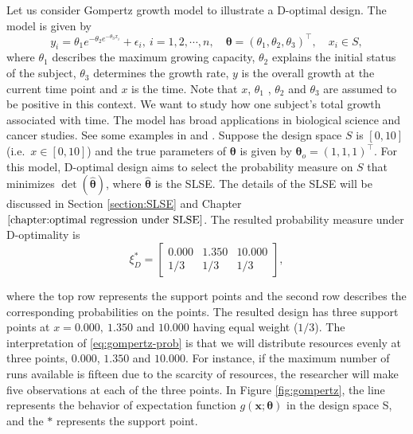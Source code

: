 \documentclass[
]{book}
\theoremstyle{definition}
\theoremstyle{definition}
\theoremstyle{definition}
\theoremstyle{definition}
\theoremstyle{remark}
\begin{document}
Let us consider Gompertz growth model to illustrate a D-optimal design. The model is given by
\begin{equation*}
y_i=\theta_1 e^{-\theta_2e^{-\theta_3 x_i}}+\epsilon_i,~i=1,2,\cdots,n,\quad \boldsymbol{\theta}
=\left(\theta_1,\theta_2,\theta_3\right)^\top,\quad x_i\in S,
\end{equation*}
where \(\theta_1\) describes the maximum growing capacity, \(\theta_2\) explains the initial status of the subject, \(\theta_3\) determines the growth rate, \(y\) is the overall growth at the current time point and \(x\) is the time. Note that \(x\), \(\theta_1\) , \(\theta_2\) and \(\theta_3\) are assumed to be positive in this context. We want to study how one subject's total growth associated with time. The model has broad applications in biological science and cancer studies. See some examples in \citet{laird1964dynamics} and \citet{kozusko2003combining}. Suppose the design space \(S\) is \([0,10]\) (i.e.~\(x\in[0,10]\)) and the true parameters of \(\boldsymbol{\theta}\) is given by \(\boldsymbol{\theta}_o=(1,1,1)^\top\). For this model, D-optimal design aims to select the probability measure on \(S\) that minimizes \(\det(\hat{\boldsymbol{\theta}})\), where \(\hat{\boldsymbol{\theta}}\) is the SLSE. The details of the SLSE will be discussed in Section \ref{section:SLSE} and Chapter \(\ref{chapter:optimal regression under SLSE}\). The resulted probability measure under D-optimality is
\begin{equation}
  \xi_D^*=
\begin{bmatrix}
 0.000 &   1.350 &  10.000\\
 1/3 &   1/3 &  1/3
\end{bmatrix},
\label{eq:gompertz-prob}
\end{equation}

where the top row represents the support points and the second row describes the corresponding probabilities on the points. The resulted design has three support points at \(x=0.000,~1.350\) and \(10.000\) having equal weight (\(1/3\)). The interpretation of \eqref{eq:gompertz-prob} is that we will distribute resources evenly at three points, \(0.000\), \(1.350\) and \(10.000\). For instance, if the maximum number of runs available is fifteen due to the scarcity of resources, the researcher will make five observations at each of the three points. In Figure \ref{fig:gompertz}, the line represents the behavior of expectation function \(g(\boldsymbol{x};\boldsymbol{\theta})\) in the design space S, and the \(*\) represents the support point.
\end{document}
